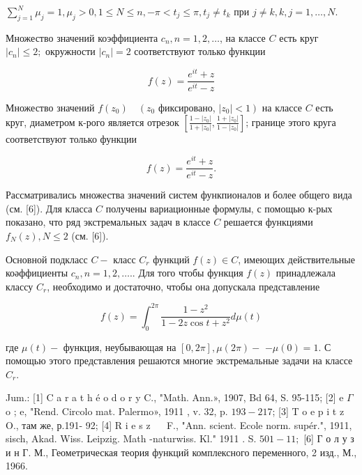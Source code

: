 \documentclass[10pt]{article}
\begin{document}
$\sum_{j=1}^{N} \mu_{j}=1, \mu_{j}>0,1 \leqslant N \leqslant n,-\pi<t_{j} \leqslant \pi, t_{j} \neq t_{k}$ при $j \neq k, k, j=1, \ldots, N$.



Множество значений коэффициента $c_{n}, n=1,2, \ldots$, на классе $C$ есть круг $\left|c_{n}\right| \leqslant 2 ;$ окружности $\left|c_{n}\right|=2$ соответствуют только функции



\[

f(z)=\frac{e^{i t}+z}{e^{i t}-z}

\]



Множество значений $f\left(z_{0}\right) \quad\left(z_{0}\right.$ фиксировано, $\left.\left|z_{0}\right|<1\right)$ на классе $C$ есть круг, диаметром к-рого является отрезок $\left[\frac{1-\left|z_{0}\right|}{1+\left|z_{0}\right|}, \frac{1+\left|z_{0}\right|}{1-\left|z_{0}\right|}\right]$; границе этого круга соответствуют только функции



\[

f(z)=\frac{e^{i t}+z}{e^{i t}-z} .

\]



Рассматривались множества значений систем функпионалов и более общего вида (см. [6]). Для класса $C$ получены вариационные формулы, с помощью к-рых показано, что ряд экстремальных задач в классе $C$ решается функциями $f_{N}(z), N \leqslant 2$ (см. [6]).



Основной подкласс $C-$ класс $C_{r}$ функций $f(z) \in C$, имеющих действительные коәффициенты $c_{n}, n=1,2, \ldots$.. Для того чтобы функция $f(z)$ принадлежала классу $C_{r}$, необходимо и достаточно, чтобы она допускала представление



\[

f(z)=\int_{0}^{2 \pi} \frac{1-z^{2}}{1-2 z \cos t+z^{2}} d \mu(t)

\]



где $\mu(t)-$ функция, неубывающая на $[0,2 \pi], \mu(2 \pi)-$ $-\mu(0)=1$. С помощью этого представления решаются многие экстремальные задачи на классе $C_{r}$.



Jum.: [1] C a r a t h é o d o r y C., "Math. Ann.», 1907, Bd 64, S. 95-115; [2] e $\Gamma$ o ; e, "Rend. Circolo mat. Palermo», 1911 , v. 32, p. $193-217$; [3] T o e p i t z O., там же, р.191- 92; [4] R i e s z $\quad$ F., "Ann. scient. Ecole norm. supér.", 1911, sisch, Akad. Wiss. Leipzig. Math -naturwiss. Kl." 1911 . S. $501-11 ;$ [6] Г о л у з и н Г. М., Геометрическая теория функций комплексного переменного, 2 изд., М., 1966.
\end{document}
